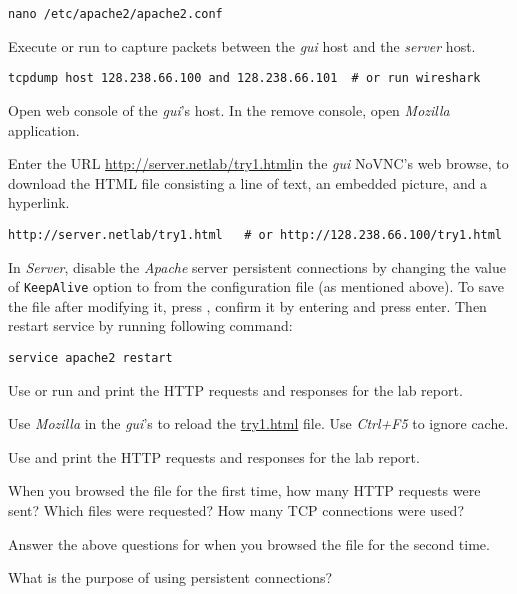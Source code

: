 \documentclass{../UTNetLab}
\begin{document}
\begin{lstlisting}
nano /etc/apache2/apache2.conf
\end{lstlisting}

Execute  or run  to capture packets between the \textit{gui} host and the \textit{server} host.

\begin{lstlisting}
tcpdump host 128.238.66.100 and 128.238.66.101  # or run wireshark
\end{lstlisting}

Open web console of the \textit{gui}'s host.
In the remove console, open \textit{Mozilla}  application.


Enter the URL \url{http://server.netlab/try1.html}in the \textit{gui} NoVNC's web browse, to download the HTML file consisting a line of text, an embedded picture, and a hyperlink.

\begin{lstlisting}
http://server.netlab/try1.html   # or http://128.238.66.100/try1.html
\end{lstlisting}

In \textit{Server}, disable the \textit{Apache} server persistent connections by changing the value of \texttt{KeepAlive} option to  from the configuration file (as mentioned above). To save the file after modifying it, press , confirm it by entering  and press enter. Then restart  service by running following command:

\begin{lstlisting}
service apache2 restart
\end{lstlisting}

Use  or run  and print the HTTP requests and responses for the lab report.

Use \textit{Mozilla} in the \textit{gui}'s to reload the \url{try1.html} file.
Use \textit{Ctrl+F5} to ignore cache.

Use  and print the HTTP requests and responses for the lab report.

\begin{report}
    \item When you browsed the  file for the first time, how many HTTP requests were sent?
    Which files were requested?
    How many TCP connections were used?

    \item Answer the above questions for when you browsed the  file for the second time.

    \item What is the purpose of using persistent connections?
\end{report}
\end{document}
